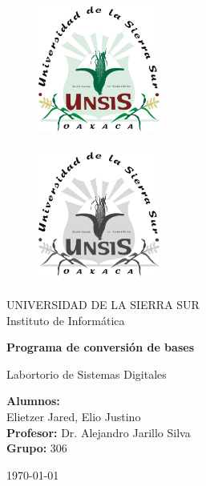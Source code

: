 \documentclass[letterpaper,12pt]{extarticle}%
\begin{document}
    \begin{titlepage}
		\begin{figure}[ht]
				\includegraphics[width=4cm]{imag//logColor.jpg}
				\label{escudoFI}
		   \endminipage

				\includegraphics[height = 4.5cm ,width=4cm]{imag//logBN.jpg} 
				\label{EscuoUNAM}
			\endminipage
		\end{figure}
		
		\vspace{0.5cm}
		
		\begin{center}
			\LARGE UNIVERSIDAD DE LA SIERRA SUR \\
			\vspace{0.3cm}
			\LARGE Instituto de Informática
			
			\vspace{.7cm} {\LARGE  \textbf{Programa de conversión de bases} \\}

			\vspace{.7cm} {\LARGE Labortorio de Sistemas Digitales}

			\vspace{.5cm}
			\begin{center}

				\LARGE{ \textbf{Alumnos:}}\\%
        		\LARGE{Elietzer Jared, Elio Justino}\\%
				\vspace{0.5cm}
				\textbf{Profesor:}  Dr. Alejandro Jarillo Silva \\
				\vspace{0.5cm}
				\textbf{Grupo:}  306
				
			\end{center}
			
			\vspace{1cm} \today
		\end{center}
	\end{titlepage}
\end{document}
